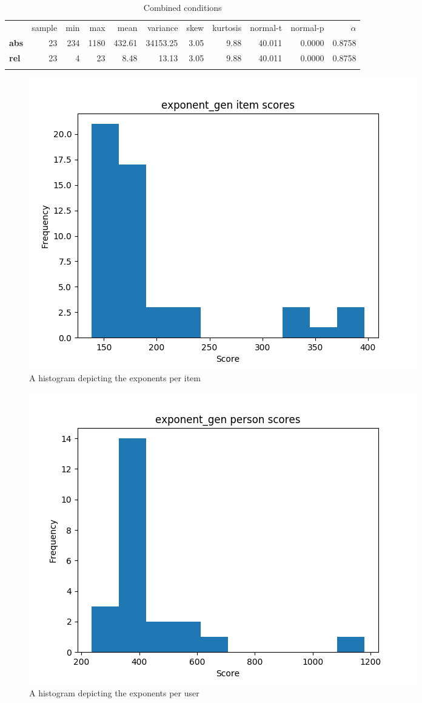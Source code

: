 \begin{longtable}[c]{@{}lrrrrrrrrrr@{}}
    \caption{Combined conditions}
    \endfirsthead
\toprule\addlinespace
& sample & min & max & mean & variance & skew & kurtosis & normal-t &
normal-p & $\alpha$
\\\addlinespace
\midrule\endhead
\textbf{abs} & 23 & 234 & 1180 & 432.61 & 34153.25 & 3.05 & 9.88 &
40.011 & 0.0000 & 0.8758
\\\addlinespace
\textbf{rel} & 23 & 4 & 23 & 8.48 & 13.13 & 3.05 & 9.88 & 40.011 &
0.0000 & 0.8758
\\\addlinespace
\bottomrule
    \label{tab:exponent_gen}
\end{longtable}

\begin{figure}
    \centering
    \includegraphics[width=.7\textwidth]{img/exponent_gen_diff.png}
    \caption{A histogram depicting the exponents per item}
    \label{fig:exponent_gen_diff}
\end{figure}
\begin{figure}
    \centering
    \includegraphics[width=.7\textwidth]{img/exponent_gen_abil.png}
    \caption{A histogram depicting the exponents per user}
    \label{fig:exponent_gen_abil}
\end{figure}

